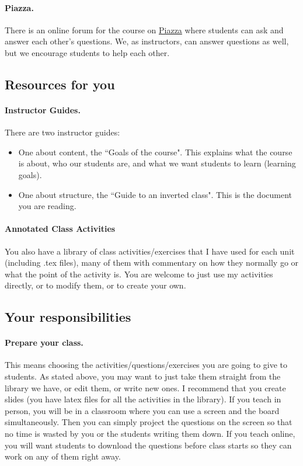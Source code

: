 \documentclass[11pt]{article}
\begin{document}
	\paragraph{Piazza.}
	There is an online forum for the course on \href{https://piazza.com/}{Piazza}
	where students can ask and answer each other's questions. We, as instructors, can
	answer questions as well, but we encourage students to help each other.

	\subsection{Resources for you}

	\paragraph{Instructor Guides.}
	There are two instructor guides:
	\begin{itemize}
		\item One about content, the ``Goals of the course". This explains what the
			course is about, who our students are, and what we want students to learn
			(learning goals).

		\item One about structure, the ``Guide to an inverted class". This is the
			document you are reading.
	\end{itemize}

	\paragraph{Annotated Class Activities}
	You also have a library of class activities/exercises that I have used for each
	unit (including .tex files), many of them with commentary on how they normally
	go or what the point of the activity is. You are welcome to just use my
	activities directly, or to modify them, or to create your own.

	\newpage

	\subsection{Your responsibilities}
	\label{responsibilities}

	\paragraph{Prepare your class.}
	This means choosing the activities/questions/exercises you are going to give to
	students. As stated above, you may want to just take them straight from the library
	we have, or edit them, or write new ones. I recommend that you create slides (you
	have latex files for all the activities in the library). If you teach in person,
	you will be in a classroom where you can use a screen and the board
	simultaneously. Then you can simply project the questions on the screen so that
	no time is wasted by you or the students writing them down. If you teach
	online, you will want students to download the questions before class starts so
	they can work on any of them right away.
\end{document}
